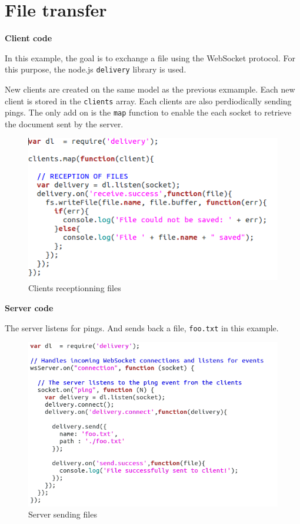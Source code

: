 \section{File transfer}

\textbf{Client code}

In this example, the goal is to exchange a file using the WebSocket protocol.
For this purpose, the node.js \texttt{delivery} library is used.

New clients are created on the same model as the previous exmample. Each new
client is stored in the \texttt{clients} array. Each clients are also
perdiodically sending pings. The only add on is the \texttt{map} function to
enable the each socket to retrieve the document sent by the server. 

\begin{figure}[H] \centering
  \includegraphics[width=\textwidth]{./Figures/WS_client_delivery.png}
\caption[Client code for file transfers with WebSocket ]{Clients receptionning files} 
\label{fig:WS_client_delivery}
\end{figure}

\textbf{Server code}

The server listens for pings. And sends back a file, \texttt{foo.txt} in this
example.

\begin{figure}[H]
	\centering
    \includegraphics[width=\textwidth]{./Figures/WS_server_delivery.png}
	\caption[Server code for file transfers with Websocket]{Server sending files}
	\label{fig:WS_server_delivery}
\end{figure}
